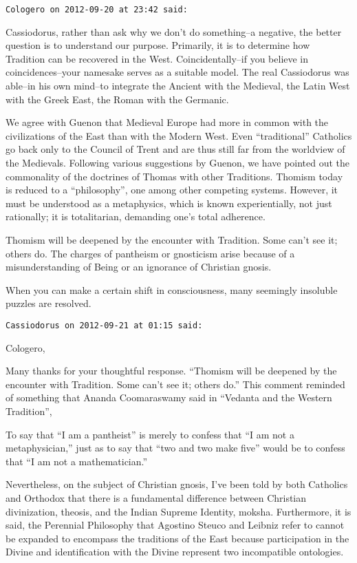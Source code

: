 \begin{footnotesize}
\begin{sffamily}
\hfill

\texttt{Cologero on 2012-09-20 at 23:42 said: }

Cassiodorus, rather than ask why we don't do something–a negative, the better question is to understand our purpose. Primarily, it is to determine how Tradition can be recovered in the West. Coincidentally–if you believe in coincidences–your namesake serves as a suitable model. The real Cassiodorus was able–in his own mind–to integrate the Ancient with the Medieval, the Latin West with the Greek East, the Roman with the Germanic.

We agree with Guenon that Medieval Europe had more in common with the civilizations of the East than with the Modern West. Even “traditional” Catholics go back only to the Council of Trent and are thus still far from the worldview of the Medievals. Following various suggestions by Guenon, we have pointed out the commonality of the doctrines of Thomas with other Traditions. Thomism today is reduced to a “philosophy”, one among other competing systems. However, it must be understood as a metaphysics, which is known experientially, not just rationally; it is totalitarian, demanding one's total adherence.

Thomism will be deepened by the encounter with Tradition. Some can't see it; others do. The charges of pantheism or gnosticism arise because of a misunderstanding of Being or an ignorance of Christian gnosis.

When you can make a certain shift in consciousness, many seemingly insoluble puzzles are resolved.


\hfill

\texttt{Cassiodorus on 2012-09-21 at 01:15 said: }

Cologero,

Many thanks for your thoughtful response. “Thomism will be deepened by the encounter with Tradition. Some can't see it; others do.” This comment reminded of something that Ananda Coomaraswamy said in “Vedanta and the Western Tradition”,

To say that “I am a pantheist” is merely to confess that “I am not a metaphysician,” just as to say that “two and two make five” would be to confess that “I am not a mathematician.”

Nevertheless, on the subject of Christian gnosis, I've been told by both Catholics and Orthodox that there is a fundamental difference between Christian divinization, theosis, and the Indian Supreme Identity, moksha. Furthermore, it is said, the Perennial Philosophy that Agostino Steuco and Leibniz refer to cannot be expanded to encompass the traditions of the East because participation in the Divine and identification with the Divine represent two incompatible ontologies. 


\end{sffamily}
\end{footnotesize}
